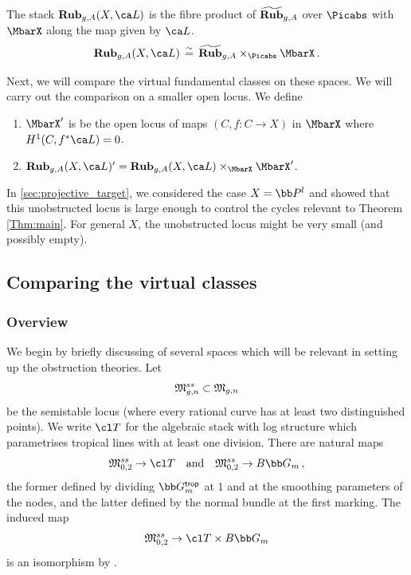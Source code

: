 \begin{lemma}
\notready
The stack $\cat{Rub}_{g,A}(X, \ca L)$ is the fibre product of $\widetilde{\mathbf{Rub}}_{g,A}$ over $\Picabs$ with $\MbarX$ along the map given by $\ca L$. %
$$\cat{Rub}_{g,A}(X, \ca L)\,  \stackrel{\sim}{=}\,  \newRub_{g,A} \times _\Picabs \MbarX\, .$$
\end{lemma}

Next, we will compare the virtual fundamental classes on these
spaces. We will carry out the comparison on a smaller open locus.
We define
\begin{enumerate}
\item[(i)]
$\MbarX'$ is be the open locus of maps
$(C, f\colon C \to X)$ in $\MbarX$ where $H^1(C, f^*\ca L) = 0$.
\item[(ii)]
$\cat{Rub}_{g,A}(X, \ca L)' = \cat{Rub}_{g,A}(X, \ca L) \times_{\MbarX} \MbarX'$.
\end{enumerate}
In  \cref{sec:projective_target}, we considered the case $X = \bb P^\kk$
and showed that this unobstructed locus is large enough
to control the cycles relevant to Theorem \ref{Thm:main}. For general $X$,
the unobstructed  locus might be very small (and possibly empty).



\subsection{Comparing the virtual classes}\label{sec:comparing_virtual_classes}
\subsubsection{Overview}
We begin by briefly discussing of several spaces which will be relevant in setting up the obstruction theories. Let $$\frak M_{g, n}^{ss}\subset \frak{M}_{g,n}$$
be the semistable locus (where every rational curve has at least two distinguished points).
We write $\cl T$ for the algebraic stack with log structure which parametrises tropical lines with at least one division. %
There are natural maps $$\frak M_{0,2}^{ss} \to \cl T\ \ \ \text{and}\ \ \  \frak M_{0,2}^{ss} \to B\bb G_m\, ,$$
the former defined by dividing $\bb G_m^{\mathsf{trop}}$ at $1$ and at the smoothing parameters of the nodes, and the latter defined by the normal bundle at the first marking. The induced map
\begin{equation}
\frak M_{0,2}^{ss} \to \cl T\times B\bb G_m
\end{equation}
is an isomorphism by \cite[Proposition 3.3.3]{Abramovich2013Expanded-degene}. %

